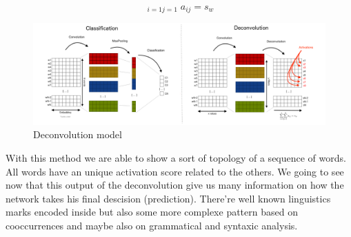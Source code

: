\begin{equation}
\mathop{\sum^{x}\sum^{y}}_{i=1  j=1}  a_{ij} = s_{w}
\label{equation}
\end{equation}

\begin{figure}[h]
\begin{center}
\includegraphics[width=16cm]{img/model.png}
\caption{Deconvolution model}
\label{cnn}
\end{center}
\end{figure}

With this method we are able to show a sort of topology of a sequence of words. All words have an unique activation score related to the others. We going to see now that this output of the deconvolution give us many information on how the network takes his final descision (prediction). There're well known linguistics marks encoded inside but also some more complexe pattern based on cooccurrences and maybe also on grammatical and syntaxic analysis.
